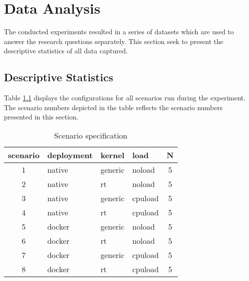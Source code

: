 \iffalse  \fi
\chapter{Data Analysis} 

The conducted experiments resulted in a series of datasets which are used to answer the research questions separately. This section seek to present the descriptive statistics of all data captured.



\section{Descriptive Statistics}

Table \ref{tab:scen-table} displays the configurations for all scenarios run during the experiment. The scenario numbers depicted in the table reflects the scenario numbers presented in this section.

\begin{table}[H]
\centering
\caption{Scenario specification}
\label{tab:scen-table}
\begin{tabular}{|c|l|l|l|c|}
\hline
\textbf{scenario} & \textbf{deployment} & \textbf{kernel} & \textbf{load} & \textbf{N} \\ \hline
1                 & native              & generic         & noload  	  &	5		   \\
2                 & native              & rt              & noload  	  &	5		   \\
3                 & native              & generic         & cpuload  	  &	5		   \\
4                 & native              & rt              & cpuload  	  &	5		   \\
5                 & docker              & generic         & noload   	  &	5		   \\
6                 & docker              & rt              & noload   	  &	5		   \\
7                 & docker              & generic         & cpuload  	  &	5		   \\
8                 & docker              & rt              & cpuload  	  &	5		   \\ \hline
\end{tabular}
\end{table}



